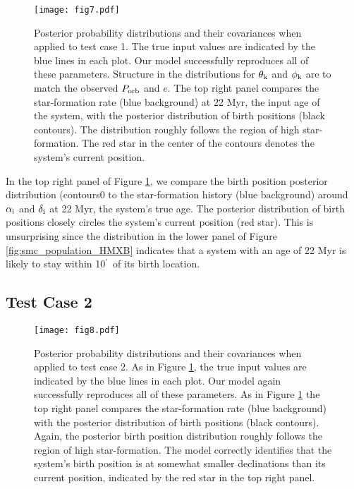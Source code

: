 \documentclass[usenatbib]{mnras}
\newcommand{\amin}{\ifmmode {^{\prime}\ }\else$^{\prime}$\fi}
\begin{document}
\begin{figure*}
\begin{center}
\texttt{[image: fig7.pdf]}
\caption{Posterior probability distributions and their covariances when applied to test case 1. The true input values are indicated by the blue lines in each plot. Our model successfully reproduces all of these parameters. Structure in the distributions for $\theta_{\rm k}$ and $\phi_{\rm k}$ are to match the observed $P_{\rm orb}$ and $e$. The top right panel compares the star-formation rate (blue background) at 22 Myr, the input age of the system, with the posterior distribution of birth positions (black contours). The distribution roughly follows the region of high star-formation. The red star in the center of the contours denotes the system's current position. }
\label{fig:test1_corner}
\end{center}
\end{figure*}


In the top right panel of Figure \ref{fig:test1_corner}, we compare the birth position posterior distribution (contours0 to the star-formation history (blue background) around $\alpha_{\rm i}$ and $\delta_{\rm i}$ at 22 Myr, the system's true age. The posterior distribution of birth positions closely circles the system's current position (red star). This is unsurprising since the distribution in the lower panel of Figure \ref{fig:smc_population_HMXB} indicates that a system with an age of 22 Myr is likely to stay within 10\amin\ of its birth location.


\subsection{Test Case 2} \label{sec:test2}

\begin{figure*}
\begin{center}
\texttt{[image: fig8.pdf]}
\caption{Posterior probability distributions and their covariances when applied to test case 2. As in Figure \ref{fig:test1_corner}, the true input values are indicated by the blue lines in each plot. Our model again successfully reproduces all of these parameters. As in Figure \ref{fig:test1_corner} the top right panel compares the star-formation rate (blue background) with the posterior distribution of birth positions (black contours). Again, the posterior birth position distribution roughly follows the region of high star-formation. The model correctly identifies that the system's birth position is at somewhat smaller declinations than its current position, indicated by the red star in the top right panel.}
\label{fig:test2_corner}
\end{center}
\end{figure*}
\end{document}
